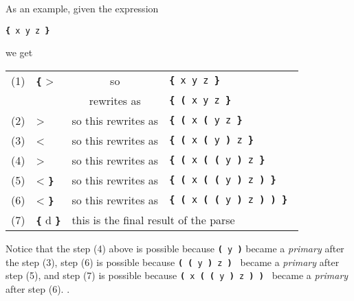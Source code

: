 \documentclass[12pt]{article}
\newcommand{\TT}[1]{{\tt \bfseries #1}}
\begin{document}
\pagebreak[4]

As an example, given the expression
\begin{center}
\tt \TT{\{}  x \IX{+} \RX{+} y \IX{*} z \TT{\}}
\end{center}
we get
\begin{center}
\begin{tabular}{llcl}
(1) &
\TT{\{} > \IX{+}
    & so & \tt \TT{\{} x \IX{+} \RX{+} y \IX{*} z \TT{\}} \\
&   & rewrites as
    & \tt \TT{\{} \TT{(} x \IX{+} \RX{+} y \IX{*} z \TT{\}}\\
(2) &
\IX{+} > \RX{+}
    & so this rewrites as
    & \tt \TT{\{} \TT{(} x \IX{+} \TT{(} \RX{+} y \IX{*} z \TT{\}} \\
(3) &
\RX{+} < \IX{*}
    & so this rewrites as
    & \tt \TT{\{} \TT{(} x \IX{+} \TT{(} \RX{+} y \TT{)} \IX{*} z \TT{\}} \\
(4) &
\IX{+} > \IX{*}
    & so this rewrites as
    & \tt \TT{\{} \TT{(} x \IX{+} \TT{(} \TT{(} \RX{+} y \TT{)} \IX{*} z
          \TT{\}} \\
(5) &
\IX{*} < \TT{\}}
    & so this rewrites as
    & \tt \TT{\{} \TT{(} x \IX{+} \TT{(} \TT{(} \RX{+} y \TT{)} \IX{*} z
          \TT{)} \TT{\}} \\
(6) &
\IX{+} < \TT{\}}
    & so this rewrites as
    & \tt \TT{\{} \TT{(} x \IX{+} \TT{(} \TT{(} \RX{+} y \TT{)} \IX{*} z
          \TT{)} \TT{)} \TT{\}} \\
(7) &
\TT{\{} d \TT{\}}
    & \multicolumn{2}{l}{this is the final result of the parse}
\end{tabular}
\end{center}

Notice that the step (4) above is possible because
{\tt \TT{(} \RX{+} y \TT{)}} became a {\em primary} after
the step (3),
step (6) is possible because
{\tt \TT{(} \TT{(} \RX{+} y \TT{)} \IX{*} z \TT{)} }
became a {\em primary} after step (5),
and step (7) is possible because
{ \tt \TT{(} x \IX{+} \TT{(} \TT{(} \RX{+} y \TT{)} \IX{*} z \TT{)} \TT{)} }
became a {\em primary} after step (6).
.
\end{document}
